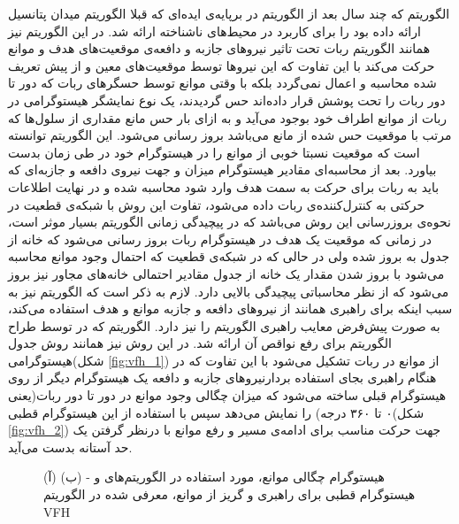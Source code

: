 الگوریتم  که چند سال بعد از الگوریتم  در  برپایه‌ی ایده‌ای که قبلا الگوریتم میدان پتانسیل ارائه داده بود را برای کاربرد در محیط‌های ناشناخته ارائه شد. در این الگوریتم نیز همانند الگوریتم  ربات تحت تاثیر نیروهای جازبه و دافعه‌ی موقعیت‌های هدف و موانع حرکت می‌کند با این تفاوت که این نیروها توسط موقعیت‌های معین و از پیش تعریف شده محاسبه و اعمال نمی‌گردد بلکه با وقتی موانع توسط حسگرهای ربات که دور تا دور ربات را تحت پوشش قرار داده‌اند حس گردیدند، یک نوع نمایشگر هیستوگرامی در ربات از موانع اطراف خود بوجود می‌آید و به ازای بار حس مانع مقداری از سلول‌ها که مرتب با موقعیت حس شده از مانع می‌باشد بروز رسانی می‌شود. این الگوریتم توانسته است که موقعیت نسبتا خوبی از موانع را در هیستوگرام خود در طی زمان بدست بیاورد. بعد از محاسبه‌ای مقادیر هیستوگرام میزان و جهت نیروی دافعه و جازبه‌ای که باید به ربات برای حرکت به سمت هدف وارد شود محاسبه شده و در نهایت اطلاعات حرکتی به کنترل‌کننده‌ی ربات داده می‌شود، تفاوت این روش با شبکه‌ی قطعیت در نحوه‌ی بروزرسانی این روش می‌باشد که در پیچیدگی زمانی الگوریتم بسیار موثر است، در  زمانی که موقعیت یک هدف در هیستوگرام ربات بروز رسانی می‌شود که خانه از جدول به بروز شده ولی در حالی که در شبکه‌ی قطعیت که احتمال وجود موانع محاسبه‌ می‌شود با بروز شدن مقدار یک خانه از جدول مقادیر احتمالی خانه‌های مجاور نیز بروز می‌شود که از نظر محاسباتی پیچیدگی بالایی دارد. لازم به ذکر است که الگوریتم  نیز به سبب اینکه برای راهبری همانند  از نیروهای دافعه و جازبه موانع و هدف استفاده می‌کند، به صورت پیش‌فرض معایب راهبری الگوریتم  را نیز دارد.
الگوریتم  که در  توسط طراح الگوریتم  برای رفع نواقص آن ارائه شد. در این روش نیز همانند روش  جدول هیستوگرامی(شکل \ref{fig:vfh_1}) از موانع در ربات تشکیل می‌شود با این تفاوت که در هنگام راهبری بجای استفاده‌ بردارنیرو‌های جازبه و دافعه یک هیستوگرام دیگر از روی هیستوگرام قبلی ساخته می‌شود که میزان چگالی وجود موانع در دور تا دور ربات(یعنی ۰ تا ۳۶۰ درجه) را نمایش می‌دهد سپس با استفاده از این هیستوگرام قطبی(شکل \ref{fig:vfh_2}) جهت حرکت مناسب برای ادامه‌ی مسیر و رفع موانع با درنظر گرفتن یک حد آستانه بدست می‌آید.

\begin{figure}
\centering
{}
\caption{(آ) هیستوگرام‌ چگالی موانع، مورد استفاده در الگوریتم‌های  و  - (ب) هیستوگرام قطبی برای راهبری و گریز از موانع، معرفی شده در الگوریتم VFH}
\label{fig:vff_vfh_histo}
\end{figure}

